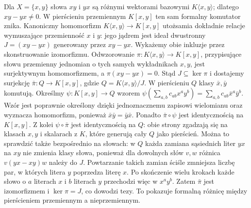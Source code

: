 \begin{przyklad}
\label{aa:prz:nc-free-example}
Dla $X=\{x,y\}$ słowa $xy$ i $yx$ są różnymi
wektorami bazowymi $K\langle x,y\rangle$; dlatego
$xy-yx\ne0$. W pierścieniu przemiennym $K[x,y]$
ten sam formalny komutator znika. Kanoniczny
homomorfizm $K\langle x,y\rangle\to K[x,y]$
utożsamia dokładnie relacje wymuszające przemienność
$x$ i $y$: jego jądrem jest ideał dwustronny
$J=(xy-yx)$ generowany przez $xy-yx$.
Wykażemy obie inkluzje przez skonstruowanie
izomorfizmu. Odwzorowanie $\pi:K\langle x,y\rangle
\to K[x,y]$, przypisujące słowu przemienny
jednomian o tych samych wykładnikach $x,y$,
jest surjektywnym homomorfizmem, a $\pi(xy-yx)=0$.
Stąd $J\subseteq\ker\pi$ i dostajemy surjekcję
$\bar\pi:Q\to K[x,y]$, gdzie
$Q=K\langle x,y\rangle/J$.
W pierścieniu $Q$ klasy $\bar x,\bar y$ komutują.
Określmy $\psi:K[x,y]\to Q$ wzorem
$\psi(\sum_{a,b}c_{ab}x^ay^b)=
\sum_{a,b}c_{ab}\bar x^a\bar y^b$.
Wzór jest poprawnie określony dzięki jednoznacznemu
zapisowi wielomianu oraz wyznacza homomorfizm,
ponieważ $\bar x\bar y=\bar y\bar x$.
Ponadto $\bar\pi\circ\psi$ jest identycznością
na $K[x,y]$. Z kolei $\psi\circ\bar\pi$ jest
identycznością na $Q$: obie strony zgadzają się
na klasach $x,y$ i skalarach z $K$, które generują
cały $Q$ jako pierścień.
Można to sprawdzić także bezpośrednio na słowach:
w $Q$ każda zamiana sąsiednich liter $yx$ na $xy$
nie zmienia klasy słowa, ponieważ dla dowolnych słów
$v,w$ różnica $v(yx-xy)w$ należy do $J$.
Powtarzanie takich zamian ściśle zmniejsza liczbę par,
w których litera $y$ poprzedza literę $x$.
Po skończenie wielu krokach każde słowo o $a$ literach
$x$ i $b$ literach $y$ przechodzi więc w $x^ay^b$.
Zatem $\bar\pi$ jest izomorfizmem i $\ker\pi=J$,
co dowodzi tezy.
To pokazuje formalną różnicę między pierścieniem
przemiennym a nieprzemiennym.
\end{przyklad}
